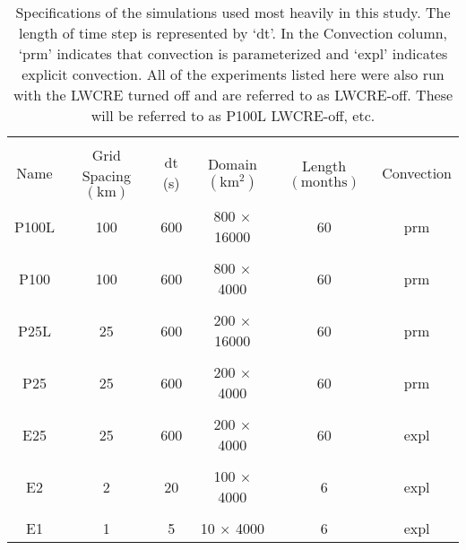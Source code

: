 \documentclass[draft]{agujournal2019}
\begin{document}
%
%

\begin{table}

\begin{center}
\caption{Specifications of the simulations used most heavily in this study.  The length of time step is represented by `dt'.  In the Convection
column, `prm'  indicates that convection is parameterized and `expl' indicates explicit convection.
All of the experiments listed here were also run with the LWCRE turned off and are referred to as LWCRE-off.
These will be referred to as P100L LWCRE-off, etc.  }
    \begin{tabular}{*{6}{c}}
    \hline
    \hline
    \\
 Name & Grid Spacing $(\mathrm{km})$ & dt (s) & Domain $ (\mathrm{km^2}) $& Length $(\mathrm{months}) $ & Convection     \\ \hline
  P100L &  100      & 600    &   800 $\times$ 16000    &  60              & prm                   \\ 
    \\
  P100 &  100     & 600           & 800 $\times$ 4000     & 60            & prm                     \\  
    \\
  P25L &  25    & 600         & 200 $\times$ 16000      & 60             & prm                     \\  
    \\
  P25  &  25    & 600         & 200 $\times$ 4000      & 60             & prm                   \\  
    \\
 E25  &   25   & 600       & 200 $\times$ 4000      & 60             & expl                \\  
    \\
 E2   &   2   & 20       & 100 $\times$ 4000      & 6             & expl                   \\ 
    \\
 E1   &   1    & 5      & 10 $\times$ 4000      & 6             & expl                 \\  \hline

    \end{tabular}\par
    \label{tab:experimentspecs}
\end{center}
\end{table}
\end{document}
